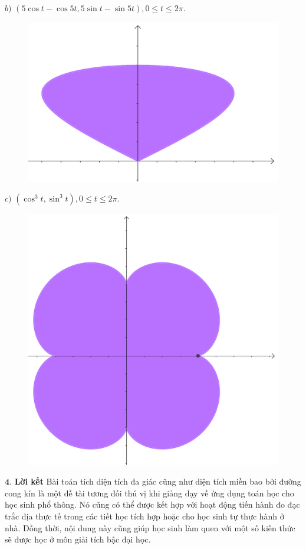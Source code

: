 \begin{multicols}{2}
\begin{figure}[H]
			\vspace*{-10pt}
		\end{figure}
		$b)$ $(5\cos t-\cos5t,5\sin t- \sin5t),0 \le t \le 2\pi$.
		\begin{figure}[H]
			\vspace*{-5pt}
			\centering
			\captionsetup{labelformat= empty, justification=centering}
			\includegraphics[width= 0.7\linewidth]{22}
			\vspace*{-10pt}
		\end{figure}
		$c)$ $(\cos^3 t,\sin^3t), 0\le t \le 2\pi$.
		\begin{figure}[H]
			\vspace*{-5pt}
			\centering
			\captionsetup{labelformat= empty, justification=centering}
			\includegraphics[width= 0.7\linewidth]{23}
			\vspace*{-10pt}
		\end{figure}
		$\pmb{4.}$ \textbf{\color{toanhocdoisong}Lời kết}
		\vskip 0.1cm
		Bài toán tích diện tích đa giác cũng như diện tích miền bao bởi đường cong kín là một đề tài tương đối thú vị khi giảng dạy về ứng dụng toán học cho học sinh phổ thông. Nó cũng có thể được kết hợp với hoạt động tiến hành đo đạc trắc địa thực tế trong các tiết học tích hợp hoặc cho học sinh tự thực hành ở nhà. Đồng thời, nội dung này cũng giúp học sinh làm quen với một số kiến thức sẽ được học ở môn giải tích bậc đại học.

\end{multicols}
